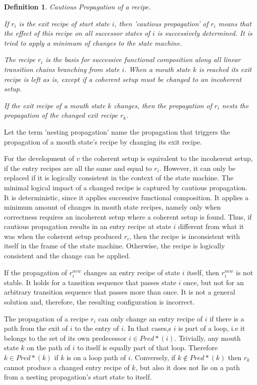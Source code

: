 \documentclass[12pt,a4paper]{scrartcl}
\newtheorem{definition}{Definition}
\begin{document}
\begin{definition} Cautious Propagation of a recipe.
    
    If $r_i$ is the exit recipe of start state $i$, then 'cautious propagation'
    of $r_i$ means that the effect of this recipe on all successor states of
    $i$ is successively determined. It is tried to apply a minimum of changes
    to the state machine.

    The recipe $r_i$ is the basis for successive functional composition along
    all linear transition chains branching from state $i$. When a mouth state
    $k$ is reached its exit recipe is left as is, except if a coherent
    setup must be changed to an incoherent setup.
    
    If the exit recipe of a  mouth state $k$ changes, then the propagation of
    $r_i$ nests the propagation of the changed exit recipe $r_k$. 
    
\end{definition}

Let the term 'nesting propagation' name the propagation that triggers the
propagation of a mouth state's recipe by changing its exit recipe.

For the development of $v$ the coherent setup is equivalent to the incoherent
setup, if the entry recipes are all the same and equal to $r_i$. However, it
can only be replaced if it is logically consistent in the context of the state
machine. The minimal logical impact of a changed recipe is captured by cautious
propagation. It is deterministic, since it applies successive functional
composition. It applies a minimum amount of changes in mouth state recipes,
namely only when correctness requires an incoherent setup where a coherent
setup is found. Thus, if cautious propagation results in an entry recipe at
state $i$ different from what it was when the coherent setup produced $r_i$,
then the recipe is inconsistent with itself in the frame of the state machine.
Otherwise, the recipe is logically consistent and the change can be applied.

If the propagation of $r^{new}_i$ changes an entry recipe of state $i$ itself,
then $r^{new}_i$ is not stable.  It holds for a tansition sequence that passes
state $i$ once, but not for an arbitrary transition sequence that passes more
than once.  It is not a general solution and, therefore, the resulting
configuration is incorrect.  

The propagation of a recipe $r_i$ can only change an entry recipe of $i$ if
there is a path from the exit of $i$ to the entry of $i$. In that cases,s $i$
is part of a loop, i.e it belongs to the set of its own predecessor $i\in
Pred*(i)$. Trivially, any mouth state $k$ on the path of $i$ to itself is
equally part of that loop. Therefore $k\in Pred*(k)$ if $k$ is on a loop path
of $i$. Conversely, if $k\notin Pred*(k)$  then $r_k$ cannot produce a changed
entry recipe of $k$, but also it does not lie on a path from a nesting
propagation's start state to itself. 
\end{document}
